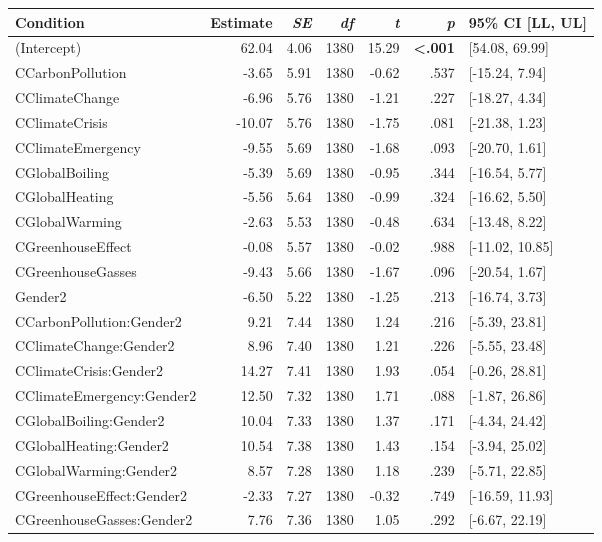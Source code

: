 \begin{table}[ht]
\centering
\begin{tabular}{lrrrrrl}
  \hline
Condition & Estimate & \textit{SE} & \textit{df} & \textit{t} & \textit{p} & 95\% CI [LL, UL] \\ 
  \hline
(Intercept) & 62.04 & 4.06 & 1380 & 15.29 & \textbf{\textless  .001} & [54.08, 69.99] \\ 
  CCarbonPollution & -3.65 & 5.91 & 1380 & -0.62 & .537 & [-15.24, 7.94] \\ 
  CClimateChange & -6.96 & 5.76 & 1380 & -1.21 & .227 & [-18.27, 4.34] \\ 
  CClimateCrisis & -10.07 & 5.76 & 1380 & -1.75 & .081 & [-21.38, 1.23] \\ 
  CClimateEmergency & -9.55 & 5.69 & 1380 & -1.68 & .093 & [-20.70, 1.61] \\ 
  CGlobalBoiling & -5.39 & 5.69 & 1380 & -0.95 & .344 & [-16.54, 5.77] \\ 
  CGlobalHeating & -5.56 & 5.64 & 1380 & -0.99 & .324 & [-16.62, 5.50] \\ 
  CGlobalWarming & -2.63 & 5.53 & 1380 & -0.48 & .634 & [-13.48, 8.22] \\ 
  CGreenhouseEffect & -0.08 & 5.57 & 1380 & -0.02 & .988 & [-11.02, 10.85] \\ 
  CGreenhouseGasses & -9.43 & 5.66 & 1380 & -1.67 & .096 & [-20.54, 1.67] \\ 
  Gender2 & -6.50 & 5.22 & 1380 & -1.25 & .213 & [-16.74, 3.73] \\ 
  CCarbonPollution:Gender2 & 9.21 & 7.44 & 1380 & 1.24 & .216 & [-5.39, 23.81] \\ 
  CClimateChange:Gender2 & 8.96 & 7.40 & 1380 & 1.21 & .226 & [-5.55, 23.48] \\ 
  CClimateCrisis:Gender2 & 14.27 & 7.41 & 1380 & 1.93 & .054 & [-0.26, 28.81] \\ 
  CClimateEmergency:Gender2 & 12.50 & 7.32 & 1380 & 1.71 & .088 & [-1.87, 26.86] \\ 
  CGlobalBoiling:Gender2 & 10.04 & 7.33 & 1380 & 1.37 & .171 & [-4.34, 24.42] \\ 
  CGlobalHeating:Gender2 & 10.54 & 7.38 & 1380 & 1.43 & .154 & [-3.94, 25.02] \\ 
  CGlobalWarming:Gender2 & 8.57 & 7.28 & 1380 & 1.18 & .239 & [-5.71, 22.85] \\ 
  CGreenhouseEffect:Gender2 & -2.33 & 7.27 & 1380 & -0.32 & .749 & [-16.59, 11.93] \\ 
  CGreenhouseGasses:Gender2 & 7.76 & 7.36 & 1380 & 1.05 & .292 & [-6.67, 22.19] \\ 
   \hline
\end{tabular}
\end{table}
